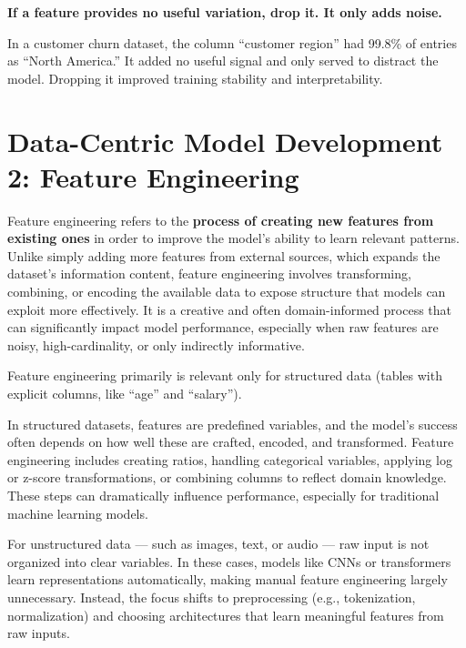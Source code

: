 \documentclass[12pt,openany]{book}
\begin{document}
\textbf{If a feature provides no useful variation, drop it. It only adds noise.}

\begin{examplebox}
In a customer churn dataset, the column “customer region” had 99.8\% of entries as “North America.” It added no useful signal and only served to distract the model. Dropping it improved training stability and interpretability.
\end{examplebox}




\chapter{Data-Centric Model Development 2: Feature Engineering}


Feature engineering refers to the \textbf{process of creating new features from existing ones} in order to improve the model’s ability to learn relevant patterns. Unlike simply adding more features from external sources, which expands the dataset’s information content, feature engineering involves transforming, combining, or encoding the available data to expose structure that models can exploit more effectively. It is a creative and often domain-informed process that can significantly impact model performance, especially when raw features are noisy, high-cardinality, or only indirectly informative.
\newline

\begin{notebox}
    Feature engineering primarily is relevant only for structured data (tables with explicit columns, like ``age'' and ``salary'').
\end{notebox}

In structured datasets, features are predefined variables, and the model's success often depends on how well these are crafted, encoded, and transformed. Feature engineering includes creating ratios, handling categorical variables, applying log or z-score transformations, or combining columns to reflect domain knowledge. These steps can dramatically influence performance, especially for traditional machine learning models.
\newline

For unstructured data — such as images, text, or audio — raw input is not organized into clear variables. In these cases, models like CNNs or transformers learn representations automatically, making manual feature engineering largely unnecessary. Instead, the focus shifts to preprocessing (e.g., tokenization, normalization) and choosing architectures that learn meaningful features from raw inputs.
\end{document}
